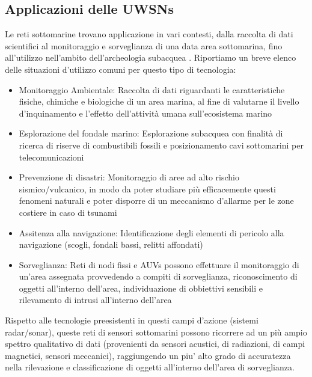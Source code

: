 \documentclass[Lau,binding=0.6cm]{sapthesis}
\begin{document}
\subsection{Applicazioni delle UWSNs}
Le reti sottomarine trovano applicazione in vari contesti, dalla raccolta di dati scientifici al monitoraggio e sorveglianza di una data area sottomarina, fino all'utilizzo nell'ambito dell'archeologia subacquea \cite{underwater}.\newline
Riportiamo un breve elenco delle situazioni d'utilizzo comuni per questo tipo di tecnologia:\newline
\begin{itemize}
\item Monitoraggio Ambientale:  \newline
Raccolta di dati riguardanti le caratteristiche fisiche, chimiche e biologiche di un area marina, al fine di valutarne il livello d'inquinamento e l'effetto dell'attività umana sull'ecosistema marino\newline
\item Esplorazione del fondale marino: \newline
Esplorazione subacquea con finalità di ricerca di riserve di combustibili fossili e posizionamento cavi sottomarini per telecomunicazioni\newline
\item Prevenzione di disastri:\newline
Monitoraggio di aree ad alto rischio sismico/vulcanico, in modo da poter studiare più efficacemente questi fenomeni naturali e poter disporre di un meccanismo d'allarme per le zone costiere in caso di tsunami\newline
\item Assitenza alla navigazione: \newline
Identificazione degli elementi di pericolo alla navigazione (scogli, fondali bassi, relitti affondati)\newline
\item Sorveglianza:\newline
Reti di nodi fissi e AUVs possono effettuare il monitoraggio di un'area assegnata provvedendo a compiti di sorveglianza, riconoscimento di oggetti all'interno dell'area, individuazione di obbiettivi sensibili e rilevamento di intrusi all'interno dell'area
\end{itemize}
Rispetto alle tecnologie preesistenti in questi campi d'azione (sistemi radar/sonar), queste reti di sensori sottomarini possono ricorrere ad un più ampio spettro qualitativo di dati (provenienti da sensori acustici, di radiazioni, di campi magnetici, sensori meccanici), raggiungendo un piu' alto grado di accuratezza nella rilevazione e classificazione di oggetti all'interno dell'area di sorveglianza.\newline
\end{document}

